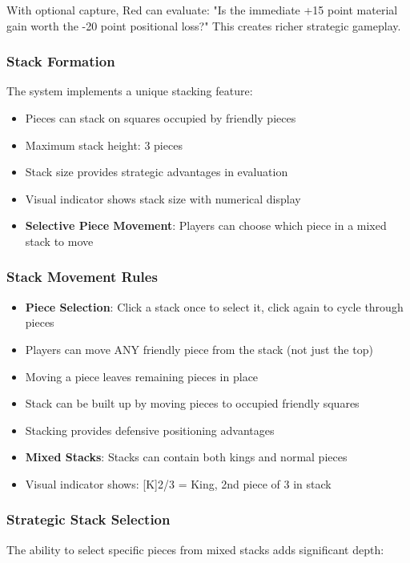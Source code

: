 \documentclass[12pt,a4paper]{article}
\begin{document}
With optional capture, Red can evaluate: "Is the immediate +15 point material gain worth the -20 point positional loss?" This creates richer strategic gameplay.

\subsubsection{Stack Formation}
The system implements a unique stacking feature:
\begin{itemize}
    \item Pieces can stack on squares occupied by friendly pieces
    \item Maximum stack height: 3 pieces
    \item Stack size provides strategic advantages in evaluation
    \item Visual indicator shows stack size with numerical display
    \item \textbf{Selective Piece Movement}: Players can choose which piece in a mixed stack to move
\end{itemize}

\subsubsection{Stack Movement Rules}
\begin{itemize}
    \item \textbf{Piece Selection}: Click a stack once to select it, click again to cycle through pieces
    \item Players can move ANY friendly piece from the stack (not just the top)
    \item Moving a piece leaves remaining pieces in place
    \item Stack can be built up by moving pieces to occupied friendly squares
    \item Stacking provides defensive positioning advantages
    \item \textbf{Mixed Stacks}: Stacks can contain both kings and normal pieces
    \item Visual indicator shows: [K]2/3 = King, 2nd piece of 3 in stack
\end{itemize}

\subsubsection{Strategic Stack Selection}

The ability to select specific pieces from mixed stacks adds significant depth:
\end{document}
